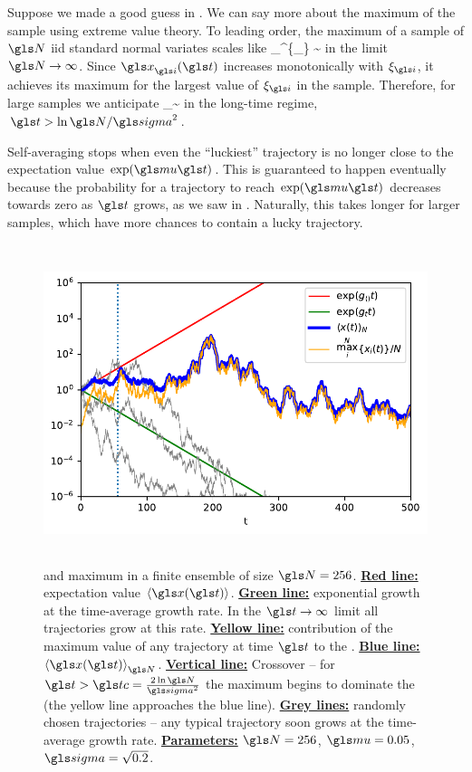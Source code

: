 Suppose we made a good guess in . We can say more about the maximum of the sample using extreme value theory. To leading order, the maximum of a sample of $\N$ iid standard normal variates scales like
\be
\max_{}^\N \{\xi_\gi\} \sim \sqrt{2\ln\N}
\ee
in the limit $\N\to\infty$. Since $\x_\gi(\t)$ increases monotonically with $\xi_\gi$, it achieves its maximum for the largest value of $\xi_\gi$ in the sample. Therefore, for large samples we anticipate
\be
\ave{\x(\t)}_\N \sim {} \exp{}
\ee
in the long-time regime, $\t>\ln\N/\gsigma^2$.

Self-averaging stops when even the ``luckiest'' trajectory is no longer close to the expectation value $\exp(\gmu \t)$. This is guaranteed to happen eventually because the probability for a trajectory to reach $\exp(\gmu \t)$ decreases towards zero as $\t$ grows, as we saw in . Naturally, this takes longer for larger samples, which have more chances to contain a lucky trajectory. 

\begin{figure}
\centering
\includegraphics[height=9.3cm]{./chapter_people/figs/trajectories.pdf}
\caption{\PEA and maximum in a finite ensemble of size $\N=256$. {\bf \underline{Red line:}} expectation value $\ave{\x(\t)}$. 
{\bf \underline{Green line:}} exponential growth at the time-average growth rate. In the $\t\to\infty$ limit all trajectories grow at this rate. 
{\bf \underline{Yellow line:}} contribution of the maximum value of any trajectory at time $\t$ to the \PEA.  
{\bf \underline{Blue line:}} \PEA $\ave{\x(\t)}_\N$.
{\bf \underline{Vertical line:}} Crossover -- for $\t>\tc=\frac{2\ln \N}{\gsigma^2}$ the maximum begins to dominate the \PEA (the yellow line approaches the blue line).
{\bf \underline{Grey lines:}} randomly chosen trajectories -- any typical trajectory soon grows at the time-average growth rate.  
{\bf \underline{Parameters:}} $\N=256$, $\gmu=0.05$, $\gsigma=\sqrt{0.2}$.}
\end{figure}
\FloatBarrier

